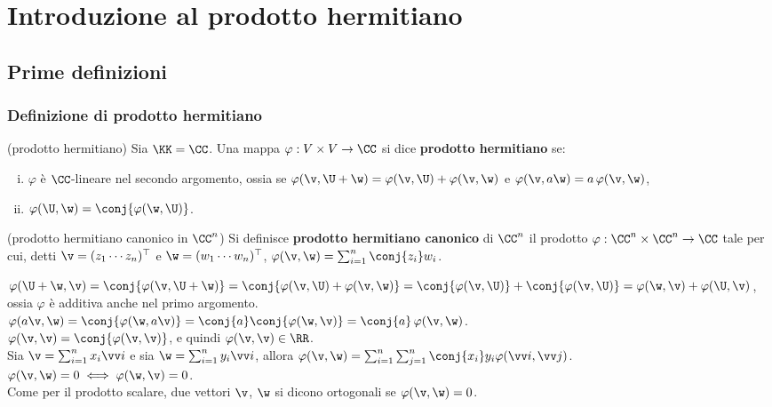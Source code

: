 \chapter{Introduzione al prodotto hermitiano}

\section{Prime definizioni}

\subsection{Definizione di prodotto hermitiano}

\begin{definition} (prodotto hermitiano) Sia $\KK = \CC$. Una mappa $\varphi : V \times V \to \CC$ si dice \textbf{prodotto hermitiano} se:
	
	\begin{enumerate}[(i)]
		\item $\varphi$ è $\CC$-lineare nel secondo argomento, ossia se $\varphi(\v, \U + \w) = \varphi(\v, \U) + \varphi(\v, \w)$ e
		$\varphi(\v, a \w) = a \, \varphi(\v, \w)$,
		\item $\varphi(\U, \w) = \conj{\varphi(\w, \U)}$.
	\end{enumerate}
\end{definition}

\begin{definition} (prodotto hermitiano canonico in $\CC^n$) Si definisce
	\textbf{prodotto hermitiano canonico} di $\CC^n$ il prodotto $\varphi : \CC^n \times \CC^n \to \CC$ tale per cui, detti $\v = (z_1 \cdots z_n)^\top$ e $\w = (w_1 \cdots w_n)^\top$, $\varphi(\v, \w) = \sum_{i=1}^n \conj{z_i} w_i$.
\end{definition}

\begin{remark}\nl
	\li $\varphi(\U + \w, \v) = \conj{\varphi(\v, \U + \w)} =
	\conj{\varphi(\v, \U) + \varphi(\v, \w)} = \conj{\varphi(\v, \U)} + \conj{\varphi(\v, \U)} = \varphi(\w, \v) + \varphi(\U, \v)$, ossia
	$\varphi$ è additiva anche nel primo argomento. \\
	\li $\varphi(a \v, \w) = \conj{\varphi(\w, a \v)} = \conj{a} \conj{\varphi(\w, \v)} = \conj{a} \, \varphi(\v, \w)$. \\
	\li $\varphi(\v, \v) = \conj{\varphi(\v, \v)}$, e quindi $\varphi(\v, \v) \in \RR$. \\
	\li Sia $\v = \sum_{i=1}^n x_i \vv i$ e sia $\w = \sum_{i=1}^n y_i \vv i$, allora $\varphi(\v, \w) = \sum_{i =1}^n \sum_{j=1}^n \conj{x_i} y_i \varphi(\vv i, \vv j)$. \\
	\li $\varphi(\v, \w) = 0 \iff \varphi(\w, \v) = 0$. \\
	\li Come per il prodotto scalare, due vettori $\v$, $\w$ si dicono ortogonali
	se $\varphi(\v, \w) = 0$.
\end{remark}

